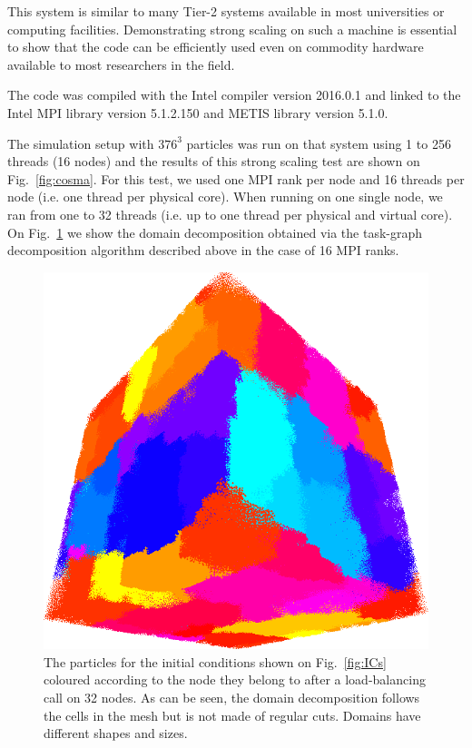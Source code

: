 \documentclass{sig-alternate-05-2015}
\begin{document}
This system is similar to many Tier-2 systems available in most universities or
computing facilities. Demonstrating strong scaling on such a machine is
essential to show that the code can be efficiently used even on commodity
hardware available to most researchers in the field.

The code was compiled with the Intel compiler version \textsc{2016.0.1} and
linked to the Intel MPI library version \textsc{5.1.2.150} and METIS library
version \textsc{5.1.0}.

The simulation setup with $376^3$ particles was run on that system using 1 to
256 threads (16 nodes) and the results of this strong scaling test are shown on
Fig.~\ref{fig:cosma}. For this test, we used one MPI rank per node and 16
threads per node (i.e. one thread per physical core). When running on one single
node, we ran from one to 32 threads (i.e. up to one thread per physical and
virtual core). On Fig.~\ref{fig:domains} we show the domain decomposition
obtained via the task-graph decomposition algorithm described above in the case
of 16 MPI ranks.

\begin{figure}
\centering
\includegraphics[width=\columnwidth]{Figures/domains}
\caption{The particles for the initial conditions shown on Fig.~\ref{fig:ICs}
  coloured according to the node they belong to after a load-balancing call on
  32 nodes. As can be seen, the domain decomposition follows the cells in the mesh
  but is not made of regular cuts. Domains have different shapes and
  sizes. \label{fig:domains}}
\end{figure}  
\end{document}
